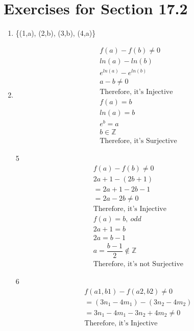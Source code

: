 \documentclass[12pt]{article}
\begin{document}
\section*{Exercises for Section 17.2}
\begin{enumerate}
    \item \{(1,a), (2,b), (3,b), (4,a)\}
	\item 
	    \begin{equation*}
	    	\begin{split}
		    f(a) - f(b) \neq 0\\
		    ln(a) - ln(b)\\
		    e^{ln(a)} - e^{ln(b)}\\
		    a -b \neq 0\\
		    \text{Therefore, it's Injective}\\
		    f(a) = b\\
		    ln(a) = b\\
		    e^b = a\\
		    b \in \mathbb{Z}\\
		    \text{Therefore, it's Surjective}
	    	\end{split}
	    \end{equation*}
	\item [5]
	    \begin{equation*}
	    	\begin{split}
		    f(a) - f(b) \ne 0\\
		    2a+1 - (2b + 1)\\
		    = 2a + 1 -2b -1\\
		    = 2a-2b \ne 0\\
		    \text{Therefore, it's Injective}\\
		    f(a) = b,\ odd\\
		    2a+1 = b\\
		    2a = b-1\\
		    a = \dfrac{b-1}{2} \notin \mathbb{Z}\\
		    \text{Therefore, it's not Surjective}
	    	\end{split}
	    \end{equation*}
	\item [6]
	    \begin{equation*}
	    	\begin{split}
		    f(a1, b1) -f(a2, b2) \ne 0\\
		    = (3n_1 - 4m_1) - (3n_2 - 4m_2)\\
		    = 3n_1 - 4m_1 - 3n_2 + 4m_2 \ne 0\\
		    \text{Therefore, it's Injective}\\

\end{split}
\end{equation*}
\end{enumerate}
\end{document}
